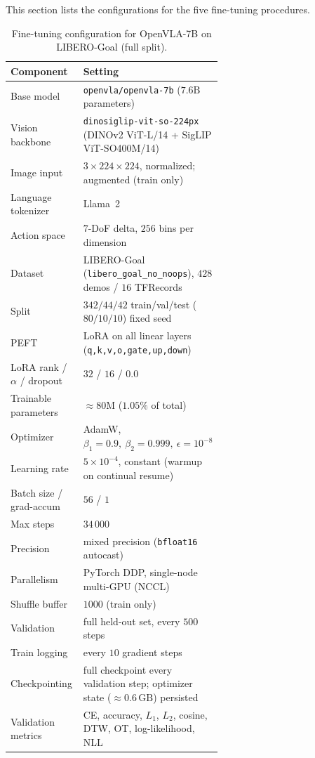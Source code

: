 \documentclass[english,12pt,a4paper,pdftex,elec,utf8]{aaltothesis}
\begin{document}
This section lists the configurations for the five fine-tuning procedures. 

\begin{table}[H]
  \centering\small
  \caption{Fine-tuning configuration for OpenVLA-7B on LIBERO-Goal (full split).}
  \label{tab:hparams_openvla}
  \begin{tabular}{@{}l p{0.60\linewidth}@{}}
    \toprule
    Component & Setting \\
    \midrule
    Base model              & \texttt{openvla/openvla-7b} ($7.6\text{B}$ parameters) \\
    Vision backbone         & \texttt{dinosiglip-vit-so-224px} (DINOv2 ViT-L/14 + SigLIP ViT-SO400M/14) \\
    Image input             & $3\times224\times224$, normalized; augmented (train only) \\
    Language tokenizer      & Llama~2 \\
    Action space            & $7$-DoF delta, $256$ bins per dimension \\
    Dataset                 & LIBERO-Goal (\texttt{libero\_goal\_no\_noops}), $428$ demos / $16$ TFRecords \\
    Split                   & $342/44/42$ train/val/test ($80/10/10$) fixed seed \\
    \midrule
    PEFT                    & LoRA on all linear layers (\texttt{q,k,v,o,gate,up,down}) \\
    LoRA rank / $\alpha$ / dropout & $32$ / $16$ / $0.0$ \\
    Trainable parameters    & $\approx\!80\text{M}$ ($1.05\%$ of total) \\
    Optimizer               & AdamW, $\beta_1{=}0.9,\ \beta_2{=}0.999,\ \epsilon{=}10^{-8}$ \\
    Learning rate           & $5\times10^{-4}$, constant (warmup on continual resume) \\
    Batch size / grad-accum & $56$ / $1$ \\
    Max steps               & $34\,000$ \\
    Precision               & mixed precision (\texttt{bfloat16} autocast) \\
    Parallelism             & PyTorch DDP, single-node multi-GPU (NCCL) \\
    \midrule
    Shuffle buffer          & $1000$ (train only) \\
    Validation              & full held-out set, every $500$ steps \\
    Train logging           & every $10$ gradient steps \\
    Checkpointing           & full checkpoint every validation step; optimizer state ($\approx\!0.6\,\text{GB}$) persisted \\
    Validation metrics      & CE, accuracy, $L_1$, $L_2$, cosine, DTW, OT, log-likelihood, NLL \\
    \bottomrule
  \end{tabular}
\end{table}
\end{document}
